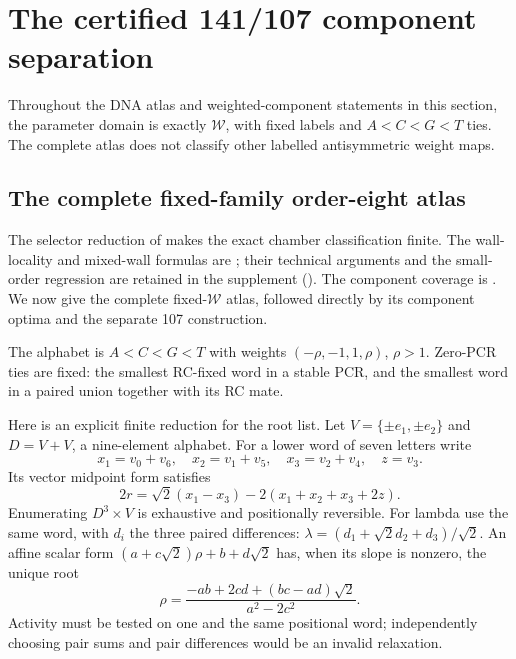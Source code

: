 \section{The certified 141/107 component separation}
Throughout the DNA atlas and weighted-component statements in this section, the parameter domain is exactly $\mathcal W$, with fixed labels and $A<C<G<T$ ties. The complete atlas does not classify other labelled antisymmetric weight maps.

\subsection{The complete fixed-family order-eight atlas}
The selector reduction of  makes the exact chamber classification finite. The wall-locality and mixed-wall formulas are ; their technical arguments and the small-order regression are retained in the supplement (). The component coverage is . We now give the complete fixed-$\mathcal W$ atlas, followed directly by its component optima and the separate 107 construction.

The alphabet is $A<C<G<T$ with weights $(-\rho,-1,1,\rho)$,
$\rho>1$. Zero-PCR ties are fixed: the smallest RC-fixed word in
a stable PCR, and the smallest word in a paired union together
with its RC mate.

Here is an explicit finite reduction for the root list. Let $V=\{\pm
e_1,\pm e_2\}$ and $D=V+V$, a nine-element alphabet. For a lower
word of seven letters write
\[
 x_1=v_0+v_6,\quad x_2=v_1+v_5,\quad
 x_3=v_2+v_4,\quad z=v_3.
\]
Its vector midpoint form satisfies
\[
 2r=\sqrt2(x_1-x_3)-2(x_1+x_2+x_3+2z).
\]
Enumerating $D^3\times V$ is exhaustive and positionally reversible.
For lambda use the same word, with $d_i$ the three paired differences:
$\lambda=(d_1+\sqrt2d_2+d_3)/\sqrt2$.
An affine scalar form $(a+c\sqrt2)\rho+b+d\sqrt2$ has, when its
slope is nonzero, the unique root
\[
 \rho=\frac{-ab+2cd+(bc-ad)\sqrt2}{a^2-2c^2}.
\]
Activity must be tested on one and the same positional word; independently
choosing pair sums and pair differences would be an invalid relaxation.

